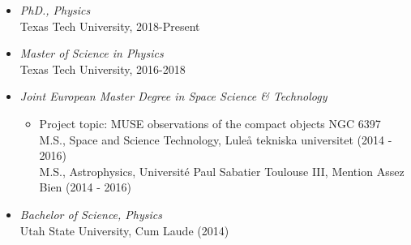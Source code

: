 \documentclass[letterpaper,10pt]{article}
\begin{document}
\begin{itemize}[label=$\blacktriangleright$]

  \item \emph{PhD., Physics}  \\
   Texas Tech University, 2018-Present




  \item \emph{Master of Science in Physics}  \\
   Texas Tech University, 2016-2018



  \item \emph{Joint European Master Degree in Space Science \& Technology} 
  \begin{itemize}[label=]
      \vspace{-.05cm}
      \item Project topic: MUSE observations of the compact objects NGC 6397 \\
      M.S., Space and Science Technology, Lule\r a tekniska universitet  (2014 - 2016) \\
      M.S., Astrophysics, Universit\'e Paul Sabatier Toulouse III, Mention Assez Bien (2014 - 2016) 
  \end{itemize}




  \item \emph{Bachelor of Science, Physics}  \\
   Utah State University, Cum Laude (2014)

\end{itemize}
\end{document}
